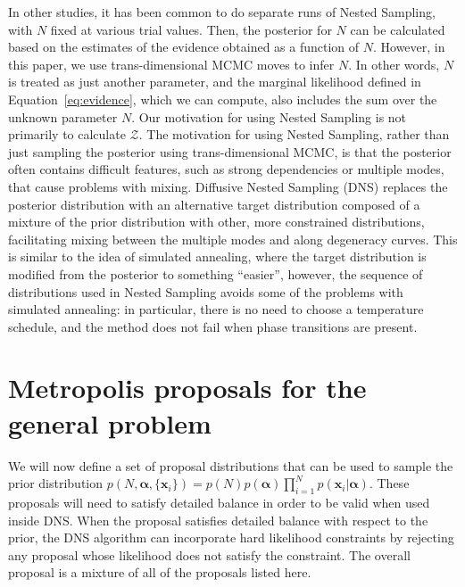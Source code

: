 \documentclass[letterpaper, 11pt]{article}
\newcommand{\hyperparams}{\boldsymbol{\alpha}}
\newcommand{\xx}{\mathbf{x}}
\begin{document}
In other studies, it has been common to do separate runs of Nested Sampling,
with $N$ fixed at various trial values.
Then, the posterior for $N$ can be calculated
based on the estimates of the evidence obtained as a function of $N$. However,
in this paper, we use trans-dimensional MCMC moves to infer $N$. In other words,
$N$ is treated as just another parameter, and the marginal likelihood defined
in Equation~\ref{eq:evidence}, which we can compute, also includes the sum over
the unknown parameter $N$. Our motivation
for using Nested Sampling is not primarily to calculate $\mathcal{Z}$.
The motivation for using Nested Sampling, rather than just sampling the
posterior using trans-dimensional MCMC, is that the posterior often contains
difficult features, such as strong dependencies or multiple modes, that cause
problems with mixing. Diffusive Nested Sampling
(DNS) replaces the posterior distribution with an alternative target
distribution composed of a mixture of the prior distribution with other, more
constrained distributions, facilitating mixing between the multiple modes
and along degeneracy curves.
This is similar to the idea of simulated annealing,
where the target distribution is modified from the posterior to something
``easier'', however,
the sequence of distributions used in Nested Sampling avoids some of the
problems with simulated annealing: in particular, there is no need to choose
a temperature schedule, and the method does not fail when phase transitions
are present.



\section{Metropolis proposals for the general problem}
We will now define a set of proposal distributions that can be used to
sample the prior distribution
$p(N, \hyperparams, \{\xx_i\}) = p(N) p(\hyperparams) \prod_{i=1}^N p(\xx_i | \hyperparams)$.
These proposals will need to satisfy detailed balance in order to be valid
when used inside DNS. When the proposal satisfies detailed balance with respect
to the prior, the DNS algorithm can incorporate hard likelihood constraints by
rejecting any proposal whose likelihood does not satisfy the constraint.
The overall proposal is a mixture of all of the proposals listed here.
\end{document}
